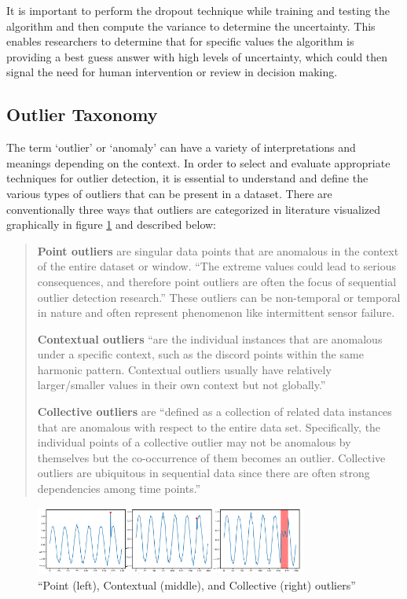 It is important to perform the dropout technique while training and testing the algorithm and then compute the variance to determine the uncertainty. This enables researchers to determine that for specific values the algorithm is providing a best guess answer with high levels of uncertainty, which could then signal the need for human intervention or review in decision making.  

\subsection{Outlier Taxonomy}

The term `outlier' or `anomaly' can have a variety of interpretations and meanings depending on the context. In order to select and evaluate appropriate techniques for outlier detection, it is essential to understand and define the various types of outliers that can be present in a dataset. There are conventionally three ways that outliers are categorized in literature visualized graphically in figure \ref{fig:outliers-graphic} and described below:
\blockquote{
\textbf{Point outliers} are singular data points that are anomalous in the context of the entire dataset or window. \enquote{The extreme values could lead to serious consequences, and therefore point outliers are often the focus of sequential outlier detection research.}\parencite{lai2021revisiting} These outliers can be non-temporal or temporal in nature and often represent phenomenon like intermittent sensor failure. 

\textbf{Contextual outliers}  \enquote{are the individual instances that are anomalous under a specific context, such as
the discord points within the same harmonic pattern. Contextual outliers usually have relatively
larger/smaller values in their own context but not globally.}\parencite{lai2021revisiting}

\textbf{Collective outliers} are \enquote{defined as a collection of related data instances that are anomalous with respect
to the entire data set. Specifically, the individual points of a collective outlier may not be anomalous
by themselves but the co-occurrence of them becomes an outlier. Collective outliers are ubiquitous
in sequential data since there are often strong dependencies among time points.}\parencite{lai2021revisiting}
}

\begin{figure}[H]
    \includegraphics[width=0.8\textwidth]{Images/outliers_graphic.PNG}
    \caption{\enquote{Point (left), Contextual (middle), and Collective (right) outliers} \parencite{lai2021revisiting}}
    \label{fig:outliers-graphic}
\end{figure}

